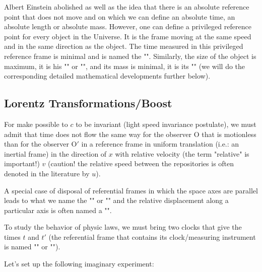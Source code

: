 	Albert Einstein abolished as well as the idea that there is an absolute reference point that does not move and on which we can define an absolute time, an absolute length or absolute mass. However, one can define a privileged reference point for every object in the Universe. It is the frame moving at the same speed and in the same direction as the object. The time measured in this privileged reference frame is minimal and is named the "". Similarly, the size of the object is maximum, it is his "" or "", and its mass is minimal, it is its "" (we will do the corresponding detailed mathematical developments further below).
	
		\subsection{Lorentz Transformations/Boost}
		For make possible to $c$ to be invariant (light speed invariance postulate), we must admit that time does not flow the same way for the observer $\text{O}$ that is motionless than for the observer $\text{O}'$ in a reference frame in uniform translation (i.e.: an inertial frame) in the direction of $x$  with relative velocity (the term "relative" is important!) $v$ (caution! the relative speed between the repositories is often denoted in the literature by $u$).
		
	
		\begin{tcolorbox}[title=Remark,colframe=black,arc=10pt]
		A special case of disposal of referential frames in which the space axes are parallel leads to what we name the "" or "" and the relative displacement along a particular axis is often named a "".
		\end{tcolorbox}	
		
		To study the behavior of physic laws, we must bring two clocks that give the times $t$ and $t'$ (the referential frame that contains its clock/measuring instrument is named "" or "").
		
		Let's set up the following imaginary experiment:
		
